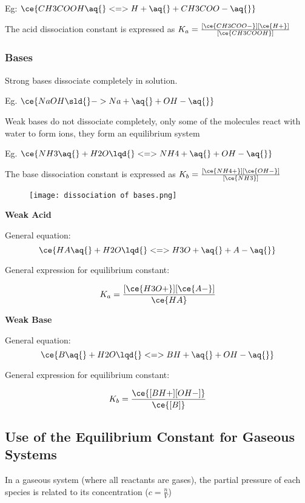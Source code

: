 			\subitem Eg: $\ce{CH3COOH \aq{} <=> H+ \aq{} + CH3COO- \aq{}}$

			The acid dissociation constant is expressed as $K_a = \frac{[\ce{CH3COO-}][\ce{H+}]}{[\ce{CH3COOH}]}$

		\subsubsection{Bases}
			Strong bases dissociate completely in solution.

			\subitem Eg. $\ce{NaOH \sld{} -> Na+ \aq{} + OH- \aq{}}$

			Weak bases do not dissociate completely, only some of the molecules react with water to form ions, they form an equilibrium system

			\subitem Eg. $\ce{NH3 \aq{} + H2O \lqd{} <=> NH4+ \aq{} + OH- \aq{}}$
			
			The base dissociation constant is expressed as $K_b = \frac{[\ce{NH4+}][\ce{OH-}]}{[\ce{NH3}]}$

			\begin{figure}[H]
				\centering
				\texttt{[image: dissociation of bases.png]}
			\end{figure}

		\begin{multicols}{2}
			\textbf{Weak Acid}

			General equation:
			$$\ce{HA \aq{} + H2O \lqd{} <=> H3O+ \aq{} + A- \aq{}}$$

			General expression for equilibrium constant:

			$$K_a = \frac{[\ce{H3O+}][\ce{A-}]}{\ce{HA}}$$
			
			\columnbreak

			\textbf{Weak Base}

			General equation:
			$$\ce{B \aq{} + H2O \lqd{} <=> BH+ \aq{} + OH- \aq{}}$$

			General expression for equilibrium constant:

			$$K_b = \frac{\ce{[BH+][OH-]}}{\ce{[B]}}$$
		\end{multicols}

	\subsection{Use of the Equilibrium Constant for Gaseous Systems}
		In a gaseous system (where all reactants are gases), the partial pressure of each species is related to its concentration ($c = \frac{n}{V}$)

